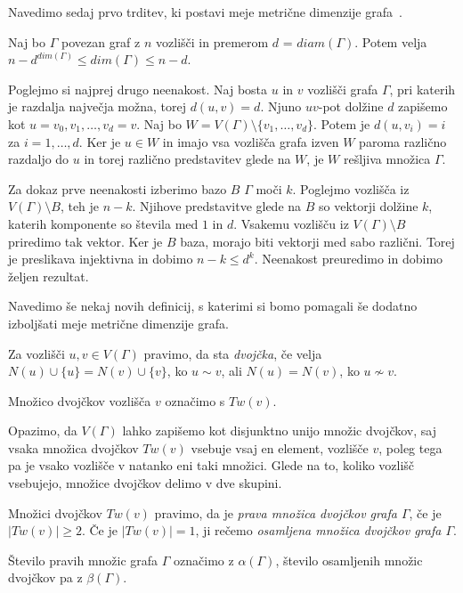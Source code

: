 \documentclass[mat1, tisk]{fmfdelo}
\begin{document}
Navedimo sedaj prvo trditev, ki postavi meje metrične dimenzije grafa~\cite{10chartrand}.
%
\begin{trditev}
  Naj bo $\Gamma$ povezan graf z $n$ vozlišči in premerom $d$ = $diam(\Gamma)$. Potem velja
  $n - d^{dim(\Gamma)} \leq dim(\Gamma) \leq n - d$.
\end{trditev}
\begin{dokaz}
  Poglejmo si najprej drugo neenakost. Naj bosta $u$ in $v$ vozlišči grafa 
  $\Gamma$, pri katerih je razdalja največja možna, torej $d(u,v) = d$. 
  Njuno $uv$-pot dolžine $d$ zapišemo kot $u=v_0, v_1, \ldots, v_d=v$. 
  Naj bo $W = V(\Gamma) \setminus \{v_1, \ldots, v_d \}$. Potem je 
  $d(u,v_i) = i$ za $i = 1, \ldots, d$. Ker je $u \in W$ in imajo 
  vsa vozlišča grafa izven $W$ paroma različno razdaljo do $u$ in 
  torej različno predstavitev glede na $W$, je $W$ 
  rešljiva množica $\Gamma$.

  Za dokaz prve neenakosti izberimo bazo $B$  $\Gamma$ moči $k$. 
  Poglejmo vozlišča iz $V(\Gamma) \setminus B$, teh je $n-k$. 
  Njihove predstavitve 
  glede na $B$ so vektorji dolžine $k$, katerih komponente so števila med 
  $1$ in $d$. Vsakemu vozlišču iz $V(\Gamma) \setminus B$ priredimo 
  tak vektor. Ker je $B$ baza, morajo biti vektorji med sabo različni. 
  Torej je preslikava injektivna in dobimo $n - k \leq d^k$. 
  Neenakost preuredimo in dobimo željen rezultat.
\end{dokaz}
%
Navedimo še nekaj novih definicij, s katerimi si bomo pomagali še dodatno 
izboljšati meje metrične dimenzije grafa.
%
\begin{definicija}
  Za vozlišči $u, v\in V(\Gamma)$ pravimo, da sta \emph{dvojčka}, če velja 
  $N(u) \cup \{u\} = N(v) \cup \{v\} $, ko $u \sim v$, ali 
  $N(u) = N(v) $, ko $u \nsim v$.

  Množico dvojčkov vozlišča $v$ označimo s $Tw(v)$.
\end{definicija}
%
Opazimo, da $V(\Gamma)$ lahko zapišemo kot disjunktno unijo množic 
dvojčkov, saj vsaka množica dvojčkov $Tw(v)$ vsebuje vsaj en element, vozlišče $v$, 
poleg tega pa je vsako vozlišče v natanko eni taki množici.
Glede na to, koliko vozlišč vsebujejo, množice dvojčkov delimo v dve skupini.
%
\begin{definicija}
  Množici dvojčkov $Tw(v)$ pravimo, da je \emph{prava množica dvojčkov grafa $\Gamma$}, 
  če je $|Tw(v)| \geq 2$. Če je $|Tw(v)| = 1$, ji rečemo 
  \emph{osamljena množica dvojčkov grafa $\Gamma$}. 

  Število pravih množic grafa $\Gamma$ označimo z \emph{$\alpha(\Gamma)$}, število 
  osamljenih množic dvojčkov pa z \emph{$\beta(\Gamma)$}.
\end{definicija}
\end{document}
